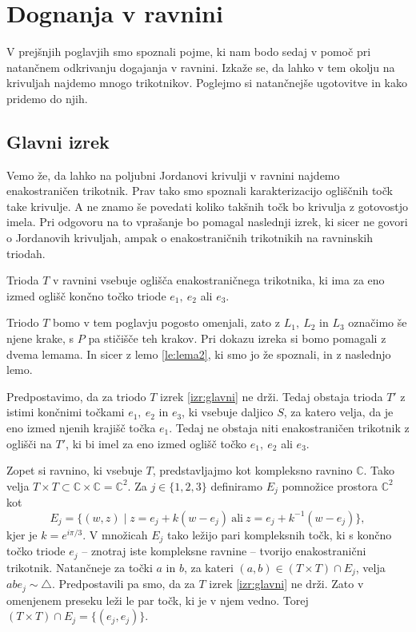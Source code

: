 \documentclass[mat1]{fmfdelo}
\newcommand{\C}{\mathbb C}
\begin{document}
\section{Dognanja v ravnini}
V prejšnjih poglavjih smo spoznali pojme, ki nam bodo sedaj v pomoč pri natančnem odkrivanju dogajanja v ravnini. Izkaže se, da lahko v tem okolju na krivuljah najdemo mnogo trikotnikov. Poglejmo si natančnejše ugotovitve in kako pridemo do njih.
\subsection{Glavni izrek} 
Vemo že, da lahko na poljubni Jordanovi krivulji v ravnini najdemo enakostraničen trikotnik. Prav tako smo spoznali karakterizacijo ogliščnih točk take krivulje. A ne znamo še povedati koliko takšnih točk bo krivulja z gotovostjo imela. Pri odgovoru na to vprašanje bo pomagal naslednji izrek, ki sicer ne govori o Jordanovih krivuljah, ampak o enakostraničnih trikotnikih na ravninskih triodah.
\begin{izrek}\label{izr:glavni}
Trioda $T$  v ravnini vsebuje oglišča enakostraničnega trikotnika, ki ima za eno izmed oglišč končno točko triode $e_1,\ e_2$ ali $e_3$.
\end{izrek}
Triodo $T$ bomo v tem poglavju pogosto omenjali, zato z $L_1,\ L_2$ in $L_3$ označimo še njene krake, s $P$ pa stičišče teh krakov. Pri dokazu izreka si bomo pomagali z dvema lemama. In sicer z lemo \ref{le:lema2}, ki smo jo že spoznali, in z naslednjo lemo.
\begin{lema}\label{le:protislovje}
Predpostavimo, da za triodo $T$ izrek \ref{izr:glavni} ne drži. Tedaj obstaja trioda $T'$ z istimi končnimi točkami $e_1,\ e_2$ in $e_3$, ki vsebuje daljico $S$, za katero velja, da je eno izmed njenih krajišč točka $e_1$. Tedaj ne obstaja niti enakostraničen trikotnik z oglišči na $T'$, ki bi imel za eno izmed oglišč točko $e_1,\ e_2$ ali $e_3$.
\end{lema}

\proof
Zopet si ravnino, ki vsebuje $T$, predstavljajmo kot kompleksno ravnino $\C$. Tako velja $T \times T \subset \C \times \C = \C^2$. Za $j \in \{1, 2, 3\}$ definiramo $E_j$ pomnožice prostora $\C^2$ kot
\[
E_j = \{(w, z) \mid z = e_j + k(w-e_j)\ \text{ali}\ z = e_j + k^{-1}(w-e_j)\},
\]
kjer je $k = e^{i\pi / 3}$. V množicah $E_j$ tako ležijo pari kompleksnih točk, ki s končno točko triode $e_j$ -- znotraj iste kompleksne ravnine -- tvorijo enakostranični trikotnik. Natančneje za točki $a$ in $b$, za kateri $(a, b) \in (T \times T) \cap E_j$, velja $abe_j \sim \triangle$. Predpostavili pa smo, da za $T$ izrek \ref{izr:glavni} ne drži. Zato v omenjenem preseku leži le par točk, ki je v njem vedno. Torej $(T \times T) \cap E_j = \{(e_j, e_j)\}$.
\end{document}
